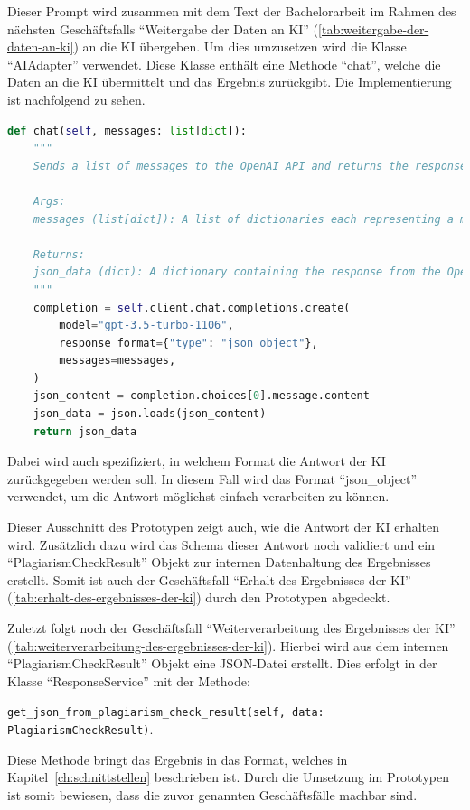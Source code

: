 Dieser Prompt wird zusammen mit dem Text der Bachelorarbeit im Rahmen des nächsten Geschäftsfalls
``Weitergabe der Daten an KI'' (\ref{tab:weitergabe-der-daten-an-ki}) an die KI übergeben.
Um dies umzusetzen wird die Klasse ``AIAdapter'' verwendet.
Diese Klasse enthält eine Methode ``chat'', welche die Daten an die KI übermittelt und das Ergebnis zurückgibt.
Die Implementierung ist nachfolgend zu sehen.
\begin{lstlisting}[caption={Weitergabe der Daten an KI},captionpos=b,label={lst:weitergabe-an-ki}, language=Python, breaklines=true]
def chat(self, messages: list[dict]):
    """
    Sends a list of messages to the OpenAI API and returns the response.

    Args:
    messages (list[dict]): A list of dictionaries each representing a message.

    Returns:
    json_data (dict): A dictionary containing the response from the OpenAI API.
    """
    completion = self.client.chat.completions.create(
        model="gpt-3.5-turbo-1106",
        response_format={"type": "json_object"},
        messages=messages,
    )
    json_content = completion.choices[0].message.content
    json_data = json.loads(json_content)
    return json_data
\end{lstlisting}

Dabei wird auch spezifiziert, in welchem Format die Antwort der KI zurückgegeben werden soll.
In diesem Fall wird das Format ``json\_object'' verwendet, um die Antwort möglichst einfach verarbeiten zu können.

Dieser Ausschnitt des Prototypen zeigt auch, wie die Antwort der KI erhalten wird.
Zusätzlich dazu wird das Schema dieser Antwort noch validiert und ein ``PlagiarismCheckResult''
Objekt zur internen Datenhaltung des Ergebnisses erstellt.
Somit ist auch der Geschäftsfall ``Erhalt des Ergebnisses der KI'' (\ref{tab:erhalt-des-ergebnisses-der-ki}) durch den Prototypen abgedeckt.

Zuletzt folgt noch der Geschäftsfall ``Weiterverarbeitung des Ergebnisses der KI'' (\ref{tab:weiterverarbeitung-des-ergebnisses-der-ki}).
Hierbei wird aus dem internen ``PlagiarismCheckResult'' Objekt eine JSON-Datei erstellt.
Dies erfolgt in der Klasse ``ResponseService'' mit der Methode:

\texttt{get\_json\_from\_plagiarism\_check\_result(self, data: PlagiarismCheckResult)}.

Diese Methode bringt das Ergebnis in das Format, welches in Kapitel~\ref{ch:schnittstellen} beschrieben ist.
Durch die Umsetzung im Prototypen ist somit bewiesen, dass die zuvor genannten Geschäftsfälle machbar sind.